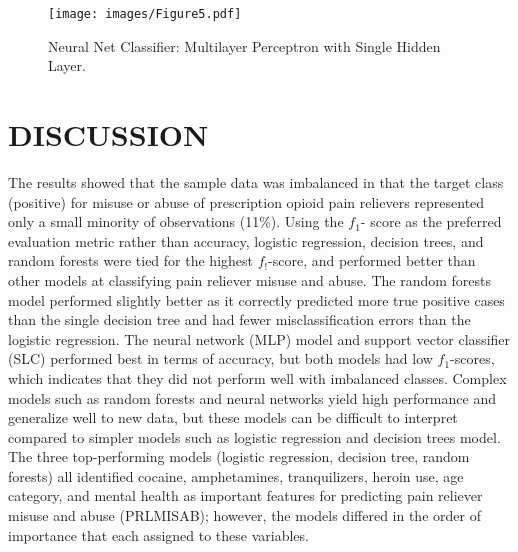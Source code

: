 \documentclass[sigconf]{acmart}
\begin{document}
\begin{figure}[!ht]
  \centering\texttt{[image: images/Figure5.pdf]}
  \caption{Neural Net Classifier: Multilayer Perceptron with Single Hidden Layer.}
  \label{f:Figure5}
\end{figure}


\section{DISCUSSION}


The results showed that the sample data was imbalanced in that the target 
class (positive) for misuse or abuse of prescription opioid pain relievers 
represented only a small minority of observations (11\%). Using the $f_1$-
score as the preferred evaluation metric rather than accuracy, logistic 
regression, decision trees, and random forests were tied for the highest 
$f_!$-score, and performed better than other models at classifying 
pain reliever misuse and abuse. The random forests model performed slightly 
better as it correctly predicted more true positive cases than the single 
decision tree and had fewer misclassification errors than the logistic 
regression. The neural network (MLP) model and support vector classifier (SLC) 
performed best in terms of accuracy, but both models had low $f_1$-scores, 
which indicates that they did not perform well with imbalanced classes. 
Complex models such as random forests and neural networks yield high 
performance and generalize well to new data, but these models can be difficult 
to interpret compared to simpler models such as logistic regression and decision 
trees model. The three top-performing models (logistic regression, decision tree, 
random forests) all identified cocaine, amphetamines, tranquilizers, heroin use, 
age category, and mental health as important features for predicting pain 
reliever misuse and abuse (PRLMISAB); however, the models differed in the order 
of importance that each assigned to these variables. 

\end{document}
